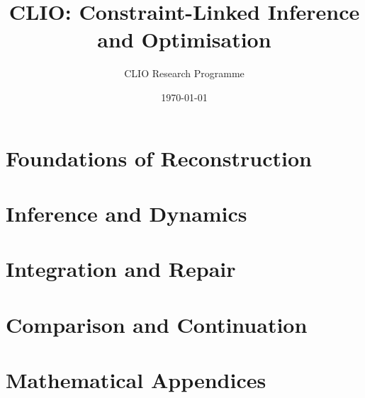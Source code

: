 \documentclass[11pt,oneside]{book}
\title{CLIO: Constraint-Linked Inference and Optimisation}
\author{CLIO Research Programme}
\date{\today}
\begin{document}
\frontmatter





\tableofcontents



\mainmatter

\part{Foundations of Reconstruction}





\part{Inference and Dynamics}





\part{Integration and Repair}




\part{Comparison and Continuation}




\appendix
\part{Mathematical Appendices}









\backmatter


\printbibliography[heading=bibintoc,title={Bibliography}]
\printindex[subject]
\printindex[notation]
\end{document}
